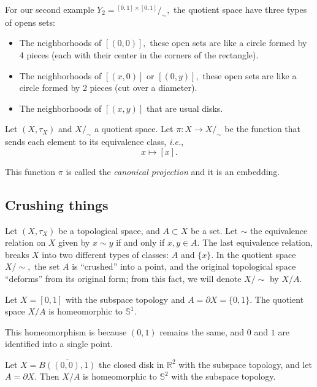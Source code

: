 \documentclass[
	fontsize=10pt, %
	twoside=false, %
	secnumdepth=1, %
]{kaobook}
\begin{document}
 \begin{example}
 For our second example $Y_2={}^{[0,1]\times[0,1]}/_\sim,$ the quotient space have three types of opens sets:
 \begin{itemize}
 \item The neighborhoods of $[(0,0)],$ these open sets are like a circle formed by 4 pieces (each with their center in the corners of the rectangle).
 
 \item The neighborhoods of $[(x,0)]$ or $[(0,y)],$ these open sets are like a circle formed by 2 pieces (cut over a diameter).
 
 \item The neighborhoods of $[(x,y)]$ that are usual disks.
 \end{itemize}
 \end{example}
 
\begin{definition}
Let $(X,\tau_X)$ and $X/_\sim$ a quotient space. Let $\pi: X\to X/_\sim$ be the function that sends each element to its equivalence class, \emph{i.e.}, $$x\mapsto [x].$$

This function $\pi$ is called the \emph{canonical projection} and it is an embedding.
\end{definition}

\subsection{Crushing things}

Let $(X,\tau_X)$ be a topological space, and $A\subset X$ be a set. Let $\sim$ the equivalence relation on $X$ given by $x\sim y$ if and only if $x,y\in A.$ The last equivalence relation, breaks $X$ into two different types of classes: $A$ and $\{x\}.$  In the quotient space $X/\sim,$ the set $A$ is ``crushed'' into a point, and the original topological space ``deforms'' from its original form; from this fact, we will denote $X/\sim$ by $X/A.$

\begin{example}
Let $X=[0,1]$ with the subspace topology and $A=\partial X=\{0,1\}.$ The quotient space $X/A$ is homeomorphic to $\mathbb{S}^1.$

This homeomorphism is because $(0,1)$ remains the same, and $0$ and $1$ are identified into a single point.
\end{example}

\begin{example}
Let $X=\overline{B((0,0),1)}$ the closed disk in $\mathbb{R}^2$ with the subspace topology, and let $A=\partial X.$ Then $X/A$ is homeomorphic to $\mathbb{S}^2$ with the subspace topology.
\end{example}
\end{document}
